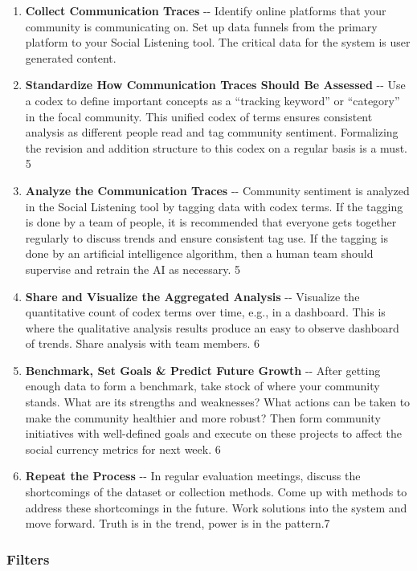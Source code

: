 \begin{enumerate}
\def\labelenumi{\arabic{enumi}.}
\item
  \textbf{Collect Communication Traces} -\/- Identify online platforms
  that your community is communicating on. Set up data funnels from the
  primary platform to your Social Listening tool. The critical data for
  the system is user generated content.
\item
  \textbf{Standardize How Communication Traces Should Be Assessed} -\/-
  Use a codex to define important concepts as a ``tracking keyword'' or
  ``category'' in the focal community. This unified codex of terms
  ensures consistent analysis as different people read and tag community
  sentiment. Formalizing the revision and addition structure to this
  codex on a regular basis is a must. 5
\item
  \textbf{Analyze the Communication Traces} -\/- Community sentiment is
  analyzed in the Social Listening tool by tagging data with codex
  terms. If the tagging is done by a team of people, it is recommended
  that everyone gets together regularly to discuss trends and ensure
  consistent tag use. If the tagging is done by an artificial
  intelligence algorithm, then a human team should supervise and retrain
  the AI as necessary. 5
\item
  \textbf{Share and Visualize the Aggregated Analysis} -\/- Visualize
  the quantitative count of codex terms over time, e.g., in a dashboard.
  This is where the qualitative analysis results produce an easy to
  observe dashboard of trends. Share analysis with team members. 6
\item
  \textbf{Benchmark, Set Goals \& Predict Future Growth} -\/- After
  getting enough data to form a benchmark, take stock of where your
  community stands. What are its strengths and weaknesses? What actions
  can be taken to make the community healthier and more robust? Then
  form community initiatives with well-defined goals and execute on
  these projects to affect the social currency metrics for next week. 6
\item
  \textbf{Repeat the Process} -\/- In regular evaluation meetings,
  discuss the shortcomings of the dataset or collection methods. Come up
  with methods to address these shortcomings in the future. Work
  solutions into the system and move forward. Truth is in the trend,
  power is in the pattern.7
\end{enumerate}

\hypertarget{filters}{%
\subsubsection{Filters}\label{filters}}

